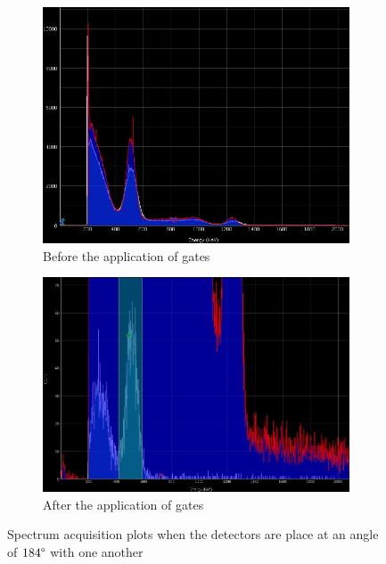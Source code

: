 \documentclass[%
 reprint,
nofootinbib,
 amsmath,amssymb,
 aps,
floatfix,
]{revtex4-2}
\begin{document}
    \begin{figure}
        \centering
        \begin{subfigure}[b]{0.5\textwidth}
            \centering
            \includegraphics[scale = 0.50]{Figures/spectrum_acquisition_184.png}
            \caption{Before the application of gates}
            \label{fig:184spec}
        \end{subfigure}
        \hfill
        \begin{subfigure}[b]{0.5\textwidth}
            \centering
            \includegraphics[scale = 0.35]{Figures/after_gate_184.png}
            \caption{After the application of gates}
            \label{fig:184gate}
        \end{subfigure}
            \caption{Spectrum acquisition plots when the detectors are place at an angle of $184 \degree$ with one another}
            \label{fig:184}
    \end{figure}
\end{document}

